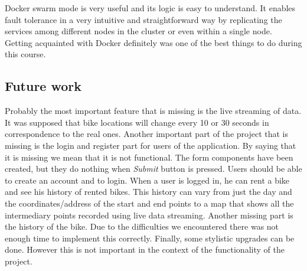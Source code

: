 Docker swarm mode is very useful and its logic is easy to understand. It enables fault tolerance in a very intuitive and straightforward way by replicating the services among different nodes in the cluster or even within a single node. Getting acquainted with Docker definitely was one of the best things to do during this course.

\subsection{Future work}
Probably the most important feature that is missing is the live streaming of data. It was supposed that bike locations will change every 10 or 30 seconds in correspondence to the real ones. Another important part of the project that is missing is the login and register part for users of the application. By saying that it is missing we mean that it is not functional. The form components have been created, but they do nothing when \textit{Submit} button is pressed. Users should be able to create an account and to login. When a user is logged in, he can rent a bike and see his history of rented bikes. This history can vary from just the day and the coordinates/address of the start and end points to a map that shows all the intermediary points recorded using live data streaming. Another missing part is the history of the bike. Due to the difficulties we encountered there was not enough time to implement this correctly. Finally, some stylistic upgrades can be done. However this is not important in the context of the functionality of the project.
